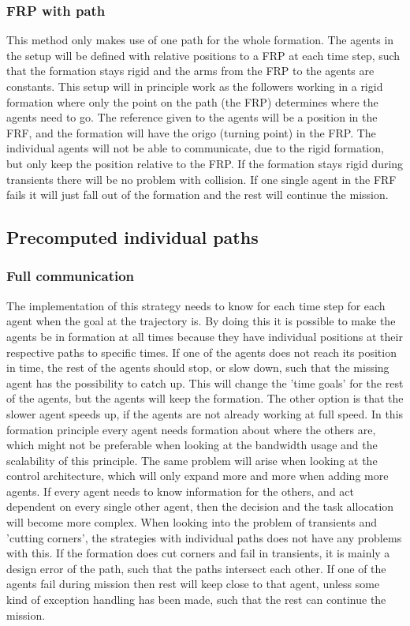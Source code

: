 \subsubsection{\ac{FRP} with path}
This method only makes use of one path for the whole formation. The agents in the setup will be defined with relative positions to a \ac{FRP} at each time step, such that the formation stays rigid and the arms from the \ac{FRP} to the agents are constants. This setup will in principle work as the followers working in a rigid formation where only the point on the path (the \ac{FRP}) determines where the agents need to go. The reference given to the agents will be a position in the \ac{FRF}, and the formation will have the origo (turning point) in the \ac{FRP}. The individual agents will not be able to communicate, due to the rigid formation, but only keep the position relative to the \ac{FRP}. If the formation stays rigid during transients there will be no problem with collision. If one single agent in the \ac{FRF} fails it will just fall out of the formation and the rest will continue the mission.

\subsection{Precomputed individual paths}
\subsubsection{Full communication}
The implementation of this strategy needs to know for each time step for each agent when the goal at the trajectory is. By doing this it is possible to make the agents be in formation at all times because they have individual positions at their respective paths to specific times. If one of the agents does not reach its position in time, the rest of the agents should stop, or slow down, such that the missing agent has the possibility to catch up. This will change the 'time goals' for the rest of the agents, but the agents will keep the formation. The other option is that the slower agent speeds up, if the agents are not already working at full speed. In this formation principle every agent needs formation about where the others are, which might not be preferable when looking at the bandwidth usage and the scalability of this principle. The same problem will arise when looking at the control architecture, which will only expand more and more when adding more agents. If every agent needs to know information for the others, and act dependent on every single other agent, then the decision and the task allocation will become more complex. When looking into the problem of transients and 'cutting corners', the strategies with individual paths does not have any problems with this. If the formation does cut corners and fail in transients, it is mainly a design error of the path, such that the paths intersect each other. If one of the agents fail during mission then rest will keep close to that agent, unless some kind of exception handling has been made, such that the rest can continue the mission.

